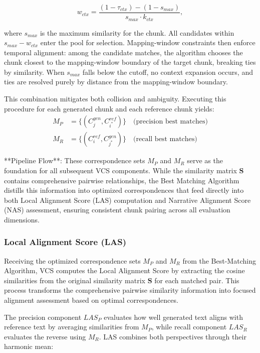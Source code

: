 \documentclass[main.tex]{subfiles}
\begin{document}
\begin{equation}
w_{ctx} = \frac{(1-\tau_{ctx})-(1-s_{max})}{s_{max} \cdot k_{ctx}},
\end{equation}

where $s_{max}$ is the maximum similarity for the chunk. All candidates within $s_{max} - w_{ctx}$ enter the pool for selection. Mapping-window constraints then enforce temporal alignment: among the candidate matches, the algorithm chooses the chunk closest to the mapping-window boundary of the target chunk, breaking ties by similarity. When $s_{max}$ falls below the cutoff, no context expansion occurs, and ties are resolved purely by distance from the mapping-window boundary.

This combination mitigates both collision and ambiguity. Executing this procedure for each generated chunk and each reference chunk yields:
\begin{align}
M_P &= \{(C_j^{gen}, C_{i^*}^{ref})\} \quad \text{(precision best matches)} \\
M_R &= \{(C_i^{ref}, C_{j^*}^{gen})\} \quad \text{(recall best matches)}
\end{align}

**Pipeline Flow**: These correspondence sets $M_P$ and $M_R$ serve as the foundation for all subsequent VCS components. While the similarity matrix $\mathbf{S}$ contains comprehensive pairwise relationships, the Best Matching Algorithm distills this information into optimized correspondences that feed directly into both Local Alignment Score (LAS) computation and Narrative Alignment Score (NAS) assessment, ensuring consistent chunk pairing across all evaluation dimensions.

\subsubsection{Local Alignment Score (LAS)}
Receiving the optimized correspondence sets $M_P$ and $M_R$ from the Best-Matching Algorithm, VCS computes the Local Alignment Score by extracting the cosine similarities from the original similarity matrix $\mathbf{S}$ for each matched pair. This process transforms the comprehensive pairwise similarity information into focused alignment assessment based on optimal correspondences.

The precision component $LAS_P$ evaluates how well generated text aligns with reference text by averaging similarities from $M_P$, while recall component $LAS_R$ evaluates the reverse using $M_R$. LAS combines both perspectives through their harmonic mean:
\end{document}
